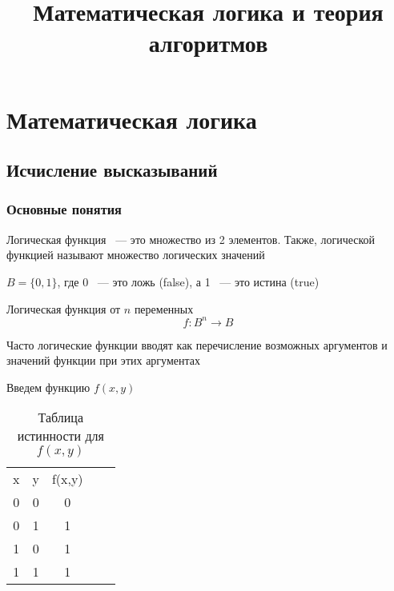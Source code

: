 \documentclass[russian]{lecture-notes}
\title{Математическая логика и теория алгоритмов}
\begin{document}
    \maketitle

    \begin{sloppypar}

        \tableofcontents


        \section{Математическая логика}

        \subsection{Исчисление высказываний}

        \subsubsection{Основные понятия}

        \begin{definition}
            Логическая функция ~--- это множество из 2 элементов. Также, логической функцией называют множество логических значений

            $B = \{0, 1 \}$, где 0 ~--- это ложь (false), а 1 ~--- это истина (true)
        \end{definition}

        \begin{definition}
            Логическая функция от $n$ переменных
            $$f : B^n \rightarrow B$$
        \end{definition}

        \begin{remark}
            Часто логические функции вводят как перечисление возможных аргументов и значений функции при этих аргументах
        \end{remark}

        \begin{example}
            Введем функцию $f(x,y)$

            \begin{table}[h!]
                \centering
                \begin{tabular}{|c|c|c|cl}
                    \cline{1-3}
                    x & y & f(x,y) & & \\ \cline{1-3}
                    0     & 0 & 0      & & \\ \cline{1-3}
                    0     & 1 & 1      & & \\ \cline{1-3}
                    1     & 0 & 1      & & \\ \cline{1-3}
                    1     & 1 & 1      & & \\ \cline{1-3}
                \end{tabular}
                \caption{Таблица истинности для $f(x,y)$}
            \end{table}


\end{example}
\end{sloppypar}
\end{document}
